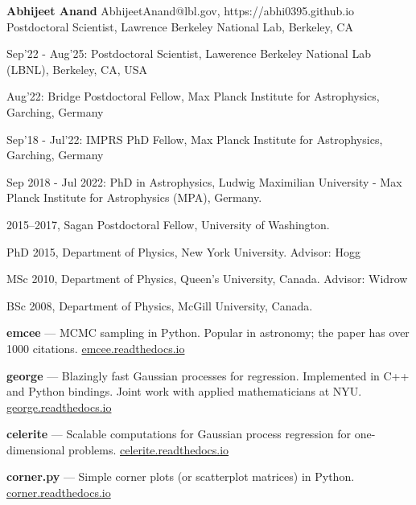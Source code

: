 \documentclass[12pt,letterpaper]{article}
\begin{document}
\thispagestyle{empty}\sloppy\sloppypar\raggedbottom

\textbf{\Large Abhijeet Anand} \hfill
\textsf{\small AbhijeetAnand@lbl.gov, https://abhi0395.github.io} \\[0.5ex]
Postdoctoral Scientist, Lawrence Berkeley National Lab, Berkeley, CA\\[0.5ex]

\begin{list}{}{\cvlist}
\item
Sep'22 - Aug'25: Postdoctoral Scientist, Lawerence Berkeley National Lab (LBNL), Berkeley, CA, USA
\item
Aug'22: Bridge Postdoctoral Fellow, Max Planck Institute for Astrophysics, Garching, Germany
\item
Sep'18 - Jul'22: IMPRS PhD Fellow, Max Planck Institute for Astrophysics,       Garching, Germany
\end{list}

\begin{list}{}{\cvlist}
\item
Sep 2018 - Jul 2022: PhD in Astrophysics, Ludwig Maximilian University - Max Planck Institute for Astrophysics (MPA), Germany.
\item

\item
2015--2017, Sagan Postdoctoral Fellow, University of Washington.
\item
PhD 2015, Department of Physics, New York University. Advisor: Hogg
\item
MSc 2010, Department of Physics, Queen's University, Canada. Advisor: Widrow
\item
BSc 2008, Department of Physics, McGill University, Canada.
\end{list}

\begin{list}{}{\cvlist}

\end{list}

\begin{list}{}{\cvlist}

\item {\bf emcee} ---
    MCMC sampling in Python. Popular in astronomy;
    the paper has over 1000 citations.
    \url{emcee.readthedocs.io}

\item {\bf george} ---
    Blazingly fast Gaussian processes for regression. Implemented in C++ and
    Python bindings. Joint work with applied mathematicians at NYU.
    \url{george.readthedocs.io}

\item {\bf celerite} ---
    Scalable computations for Gaussian process regression for one-dimensional
    problems.
    \url{celerite.readthedocs.io}

\item {\bf corner.py} ---
    Simple corner plots (or scatterplot matrices) in Python.
    \url{corner.readthedocs.io}

\end{list}
\end{document}
